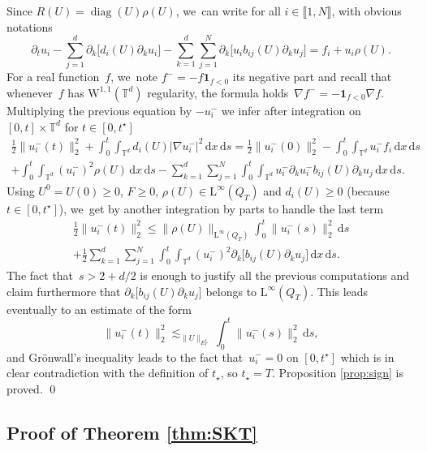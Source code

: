 \documentclass[10pt]{amsart}
\DeclareMathOperator{\diag}{diag}
\theoremstyle{definition}
\newcommand\T{\mathbb{T}}
\newcommand\dd{\mathrm{d}}
\renewcommand\L{\mathrm{L}}
\newcommand\W{\mathrm{W}}
\begin{document}
Since $R(U)= \diag(U)\rho(U)$, we~can write for all $i\in\llbracket 1,N\rrbracket$, with obvious notations\vspace*{-3pt}
\[
\partial_t u_i - \sum_{j=1}^d \partial_k \bigl[d_i(U)\partial_k u_i\bigr]-\sum_{k=1}^d \sum_{j=1}^N \partial_k \bigl[u_i b_{ij}(U) \partial_k u_j \bigr] = f_i + u_i \rho(U).
\]
For a real function~$f$, we~note $f^- = - f\mathbf{1}_{f<0}$ its negative part and recall that whenever~$f$ has $\W^{1,1}(\T^d)$ regularity, the formula holds~$\nabla f^- = -\mathbf{1}_{f<0} \nabla f$. Multiplying the previous equation by $-u_i^-$ we infer after integration on $[0,t]\times\T^d$ for $t\in[0,t^\star]$\vspace*{-7pt}
\begin{multline*}
\frac12 \|u_i^-(t)\|_2^2 + \int_0^t \int_{\T^d} d_i(U)|\nabla u_i^-|^2 \, \dd x\, \dd s= \frac12 \|u_i^-(0)\|_2^2 - \int_0^t \int_{\T^d} u_i^- f_i \, \dd x\, \dd s \\[-3pt]
+ \int_0^t \int_{\T^d} (u_i^-)^2 \rho(U) \, \dd x\, \dd s- \sum_{k=1}^d \sum_{j=1}^N \int_0^t \int_{\T^d} u_i^- \partial_k u_i^- b_{ij}(U) \partial_k u_j\, \dd x\, \dd s.
\end{multline*}
Using $U^0=U(0)\geq 0$, $F\geq0$, $\rho(U)\in\L^\infty(Q_{T})$ and $d_i(U)\geq 0$ (because $t\in[0,t^\star]$), we~get by another integration by parts to handle the last term\vspace*{-5pt}
\begin{multline*}
\frac12 \|u_i^-(t)\|_2^2 \leq \|\rho(U)\|_{\L^\infty(Q_T)} \int_0^t \|u_i^-(s)\|_2^2 \,\dd s \\[-8pt]
+ \frac12 \sum_{k=1}^d \sum_{j=1}^N \int_0^t \int_{\T^d} (u_i^-)^2 \partial_k\bigl[b_{ij}(U) \partial_k u_j\bigr]
\, \dd x\, \dd s.
\end{multline*}
The fact that~$s>2+d/2$ is enough to justify all the previous computations and claim furthermore that $\partial_k \bigl[b_{ij}(U)\partial_k u_j\bigr]$ belongs to $\L^\infty(Q_T)$. This leads eventually to an estimate of the form
\[
\|u_i^-(t)\|_2^2 \lesssim_{\|U\|_{E^s_T}} \int_0^t \|u_i^-(s)\|_2^2\,\dd s,
\]
and Grönwall's inequality leads to the fact that~$u_i^-=0$ on $[0,t^\star]$ which is in clear contradiction with the definition of $t_\star$, so $t_\star = T$. Proposition \ref{prop:sign} is proved. \qed

\subsection{Proof of Theorem \ref{thm:SKT}}
\end{document}
